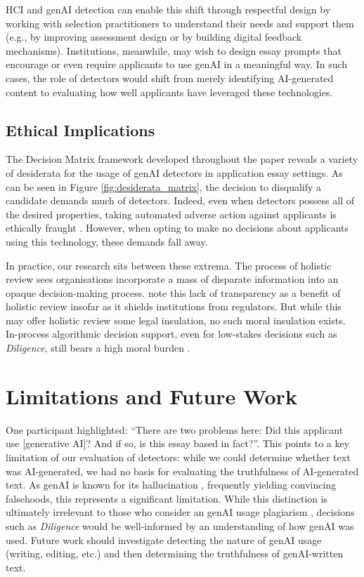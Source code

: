 HCI and genAI detection can enable this shift through respectful design \cite{VanKleek_Seymour_Binns_Shadbolt_2018} by working with selection practitioners to understand their needs and support them (e.g., by improving assessment design or by building digital feedback mechanisms). Institutions, meanwhile, may wish to design essay prompts that encourage or even require applicants to use genAI in a meaningful way. In such cases, the role of detectors would shift from merely identifying AI-generated content to evaluating how well applicants have leveraged these technologies.

\subsection{Ethical Implications}
The Decision Matrix framework developed throughout the paper reveals a variety of desiderata for the usage of genAI detectors in application essay settings. As can be seen in Figure \ref{fig:desiderata_matrix}, the decision to disqualify a candidate demands much of detectors. Indeed, even when detectors possess all of the desired properties, taking automated adverse action against applicants is ethically fraught \cite{Lashkari_Cheng_2023}. However, when opting to make no decisions about applicants using this technology, these demands fall away.

In practice, our research sits between these extrema. The process of holistic review sees organisations incorporate a mass of disparate information into an opaque decision-making process. \textcite{hirschman_dequantifying_2016} note this lack of transparency as a benefit of holistic review insofar as it shields institutions from regulators. But while this may offer holistic review some legal insulation, no such moral insulation exists. In-process algorithmic decision support, even for low-stakes decisions such as \emph{Diligence}, still bears a high moral burden \cite{Lashkari_Cheng_2023}.

\section{Limitations and Future Work}
One participant highlighted: ``There are two problems here: Did this applicant use [generative AI]? And if so, is this essay based in fact?''. This points to a key limitation of our evaluation of detectors: while we could determine whether text was AI-generated, we had no basis for evaluating the truthfulness of AI-generated text. As genAI is known for its hallucination \cite{alkaissi_artificial_2023}, frequently yielding convincing falsehoods, this represents a significant limitation. While this distinction is ultimately irrelevant to those who consider an genAI usage plagiarism \cite{h_holden_thorp_chatgpt_2023}, decisions such as \emph{Diligence} would be well-informed by an understanding of how genAI was used. Future work should investigate detecting the nature of genAI usage (writing, editing, etc.) and then determining the truthfulness of genAI-written text.

